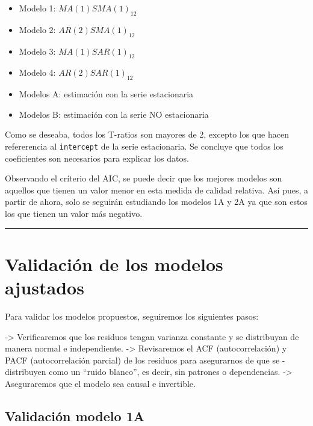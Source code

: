 \documentclass[
]{article}
\providecommand{\tightlist}{%
  \setlength{\itemsep}{0pt}\setlength{\parskip}{0pt}}
\begin{document}
\begin{itemize}
\tightlist
\item
  Modelo 1: \(MA(1)SMA(1)_{12}\)
\item
  Modelo 2: \(AR(2)SMA(1)_{12}\)
\item
  Modelo 3: \(MA(1)SAR(1)_{12}\)
\item
  Modelo 4: \(AR(2)SAR(1)_{12}\)
\item
  Modelos A: estimación con la serie estacionaria
\item
  Modelos B: estimación con la serie NO estacionaria
\end{itemize}

Como se deseaba, todos los T-ratios son mayores de 2, excepto los que
hacen refererencia al \texttt{intercept} de la serie estacionaria. Se
concluye que todos los coeficientes son necesarios para explicar los
datos.

Observando el críterio del AIC, se puede decir que los mejores modelos
son aquellos que tienen un valor menor en esta medida de calidad
relativa. Así pues, a partir de ahora, solo se seguirán estudiando los
modelos 1A y 2A ya que son estos los que tienen un valor más negativo.

\medskip

\begin{center}\rule{0.5\linewidth}{0.5pt}\end{center}

\hypertarget{validaciuxf3n-de-los-modelos-ajustados}{%
\section{Validación de los modelos
ajustados}\label{validaciuxf3n-de-los-modelos-ajustados}}

Para validar los modelos propuestos, seguiremos los siguientes pasos:

-\textgreater{} Verificaremos que los residuos tengan varianza constante
y se distribuyan de manera normal e independiente. -\textgreater{}
Revisaremos el ACF (autocorrelación) y PACF (autocorrelación parcial) de
los residuos para asegurarnos de que se - distribuyen como un ``ruido
blanco'', es decir, sin patrones o dependencias. -\textgreater{}
Aseguraremos que el modelo sea causal e invertible.

\hypertarget{validaciuxf3n-modelo-1a}{%
\subsection{Validación modelo 1A}\label{validaciuxf3n-modelo-1a}}
\end{document}
